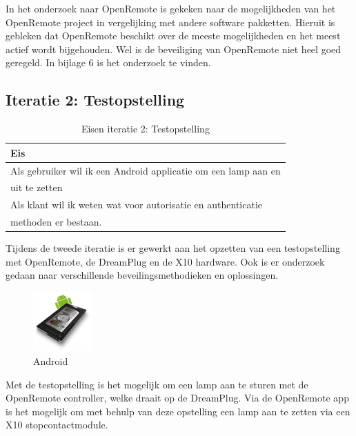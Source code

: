 \documentclass[]{article}
\begin{document}
In het onderzoek naar OpenRemote is gekeken naar de mogelijkheden van het
OpenRemote project in vergelijking met andere software pakketten. Hieruit is 
gebleken dat OpenRemote beschikt over de meeste mogelijkheden en het meest
actief wordt bijgehouden. Wel is de beveiliging van OpenRemote niet heel
goed geregeld. In bijlage 6 is het onderzoek te vinden.

\newpage
\subsection{Iteratie 2: Testopstelling}
\begin{table}[htpb]
  \caption{Eisen iteratie 2: Testopstelling}
  \begin{center}
    \begin{tabular}{|| l ||}\hline
        Eis                                                              \\\hline\hline
        Als gebruiker wil ik een Android applicatie om een lamp aan en   \\ 
        uit te zetten                                                    \\\hline
        Als klant wil ik weten wat voor autorisatie en authenticatie    \\
        methoden er bestaan.                                             \\\hline
    \end{tabular}
  \end{center}
\end{table}

Tijdens de tweede iteratie is er gewerkt aan het opzetten van een
testopstelling met OpenRemote, de DreamPlug en de X10 hardware. Ook is er
onderzoek gedaan naar verschillende beveilingsmethodieken en oplossingen.

\begin{figure}
  \begin{center}
    \includegraphics[width=0.20\textwidth]{android.pdf}
  \end{center}
  \caption{Android}
\end{figure}

Met de testopstelling is het mogelijk om een lamp
aan te sturen met de OpenRemote controller, welke draait op de
DreamPlug. Via de OpenRemote app is het mogelijk om met behulp van deze
opstelling een lamp aan te zetten via een X10 stopcontactmodule.
\end{document}
